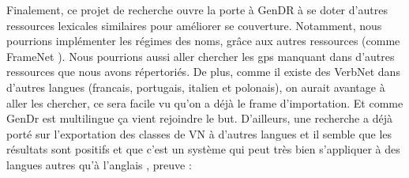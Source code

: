Finalement, ce projet de recherche ouvre la porte à GenDR à se doter d'autres ressources lexicales similaires pour améliorer se couverture. Notamment, nous pourrions implémenter les régimes des noms, grâce aux autres ressources (comme FrameNet \cite{FillmoreBackgroundFramenet2003a}). Nous pourrions aussi aller chercher les gps manquant dans d'autres ressources que nous avons répertoriés. De plus, comme il existe des VerbNet dans d'autres langues (francais, portugais, italien et polonais), on aurait avantage à aller les chercher, ce sera facile vu qu'on a déjà le frame d'importation. Et comme GenDr est multilingue ça vient rejoindre le but. D'ailleurs, une recherche a déjà porté sur l'exportation des classes de VN à d'autres langues et il semble que les résultats sont positifs et que c'est un système qui peut très bien s'appliquer à des langues autres qu'à l'anglais \citep{Majewska2017}, preuve :


